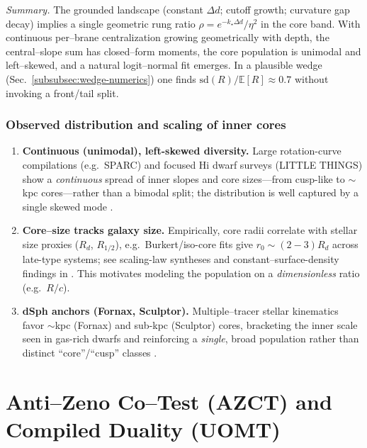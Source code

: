\documentclass[10pt]{article}
\theoremstyle{definition}
\theoremstyle{plain}
\begin{document}
\medskip
\noindent\emph{Summary.} The grounded landscape (constant $\Delta d$; cutoff growth; curvature gap decay) implies a single geometric rung ratio $\rho=e^{-k_\star\Delta d}/\eta^2$ in the core band. With continuous per–brane centralization growing geometrically with depth, the central–slope sum has closed–form moments, the core population is unimodal and left–skewed, and a natural logit–normal fit emerges. In a plausible wedge (Sec.~\ref{subsubsec:wedge-numerics}) one finds $\mathrm{sd}(R)/\mathbb E[R]\approx 0.7$ without invoking a front/tail split.

\subsubsection*{Observed distribution and scaling of inner cores}\label{subsubsec:uom-main-023}

\begin{enumerate}[leftmargin=1.4em,itemsep=2pt]
\item \textbf{Continuous (unimodal), left-skewed diversity.}
Large rotation-curve compilations (e.g.\ SPARC) and focused H{\sc i} dwarf surveys
(LITTLE THINGS) show a \emph{continuous} spread of inner slopes and core sizes—from
cusp-like to $\sim$kpc cores—rather than a bimodal split; the distribution is well
captured by a single skewed mode \cite{Lelli2016SPARC,Oh2015,Oman2015}.

\item \textbf{Core–size tracks galaxy size.}
Empirically, core radii correlate with stellar size proxies ($R_d$, $R_{1/2}$), e.g.\
Burkert/iso-core fits give $r_0\!\sim\!(2{-}3)R_d$ across late-type systems; see
scaling-law syntheses and constant–surface-density findings in \cite{KormendyFreeman2004,Donato2009}.
This motivates modeling the population on a \emph{dimensionless} ratio (e.g.\ $R/c$).

\item \textbf{dSph anchors (Fornax, Sculptor).}
Multiple–tracer stellar kinematics favor $\sim$kpc (Fornax) and sub-kpc (Sculptor) cores,
bracketing the inner scale seen in gas-rich dwarfs and reinforcing a \emph{single}, broad
population rather than distinct “core”/“cusp” classes \cite{WalkerPenarrubia2011,Read2019}.
\end{enumerate}

\section{Anti--Zeno Co--Test (AZCT) and Compiled Duality (UOMT)}
\label{sec:azct-uomt}
\end{document}
